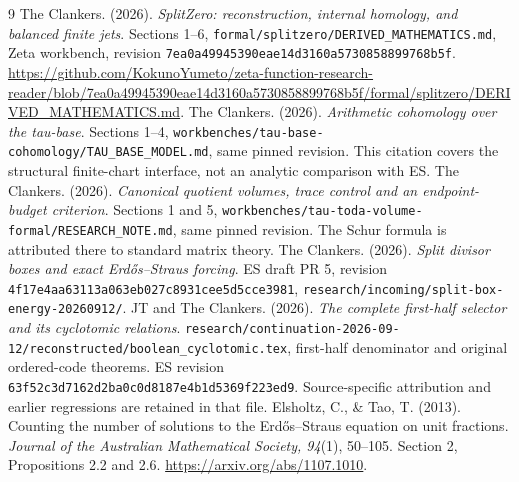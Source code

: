\begin{thebibliography}{9}
 The Clankers. (2026). \emph{SplitZero: reconstruction, internal homology, and balanced finite jets}. Sections 1--6, \texttt{formal/splitzero/DERIVED\_MATHEMATICS.md}, Zeta workbench, revision \texttt{7ea0a49945390eae14d3160a5730858899768b5f}.
\url{https://github.com/KokunoYumeto/zeta-function-research-reader/blob/7ea0a49945390eae14d3160a5730858899768b5f/formal/splitzero/DERIVED_MATHEMATICS.md}.
 The Clankers. (2026). \emph{Arithmetic cohomology over the tau-base}. Sections 1--4, \texttt{workbenches/tau-base-cohomology/TAU\_BASE\_MODEL.md}, same pinned revision. This citation covers the structural finite-chart interface, not an analytic comparison with ES.
 The Clankers. (2026). \emph{Canonical quotient volumes, trace control and an endpoint-budget criterion}. Sections 1 and 5, \texttt{workbenches/tau-toda-volume-formal/RESEARCH\_NOTE.md}, same pinned revision. The Schur formula is attributed there to standard matrix theory.
 The Clankers. (2026). \emph{Split divisor boxes and exact Erd\H{o}s--Straus forcing}. ES draft PR 5, revision \texttt{4f17e4aa63113a063eb027c8931cee5d5cce3981}, \texttt{research/incoming/split-box-energy-20260912/}.
 JT and The Clankers. (2026). \emph{The complete first-half selector and its cyclotomic relations}. \texttt{research/continuation-2026-09-12/reconstructed/boolean\_cyclotomic.tex}, first-half denominator and original ordered-code theorems. ES revision \texttt{63f52c3d7162d2ba0c0d8187e4b1d5369f223ed9}. Source-specific attribution and earlier regressions are retained in that file.
 Elsholtz, C., \& Tao, T. (2013). Counting the number of solutions to the Erd\H{o}s--Straus equation on unit fractions. \emph{Journal of the Australian Mathematical Society, 94}(1), 50--105. Section 2, Propositions 2.2 and 2.6. \url{https://arxiv.org/abs/1107.1010}.
\end{thebibliography}
